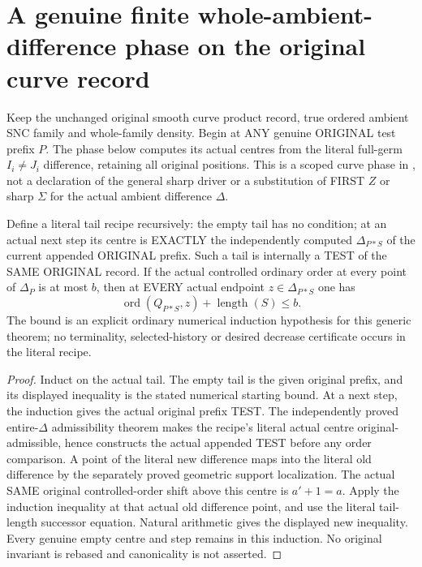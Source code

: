\section{A genuine finite whole-ambient-difference phase on the original curve record}

Keep the unchanged original smooth curve product record, true ordered ambient
SNC family and whole-family density. Begin at ANY genuine ORIGINAL test
prefix $P$. The phase below computes its actual centres from the literal
full-germ $I_i\ne J_i$ difference, retaining all original positions. This
is a scoped curve phase in \cite[\S12]{bierstone-milman97-invent-math},
not a declaration of the general sharp driver or a substitution of FIRST
$Z$ or sharp $\Sigma$ for the actual ambient difference $\Delta$.

\begin{theorem}
\label{hir:sharp-original-curve-literal-ambient-difference-history-order-bound}
\leanok
Define a literal tail recipe recursively: the empty tail has no condition;
at an actual next step its centre is EXACTLY the independently computed
$\Delta_{P*S}$ of the current appended ORIGINAL prefix. Such a tail is
internally a TEST of the SAME ORIGINAL record. If the actual controlled
ordinary order at every point of $\Delta_P$ is at most $b$, then at EVERY
actual endpoint $z\in\Delta_{P*S}$ one has
\[
 \operatorname{ord}(Q_{P*S},z)+\operatorname{length}(S)\leq b.
\]
The bound is an explicit ordinary numerical induction hypothesis for this
generic theorem; no terminality, selected-history or desired decrease
certificate occurs in the literal recipe.
\end{theorem}
\begin{proof}
Induct on the actual tail. The empty tail is the given original prefix,
and its displayed inequality is the stated numerical starting bound.
At a next step, the induction gives the actual original prefix TEST.
The independently proved entire-$\Delta$ admissibility theorem makes
the recipe's literal actual centre original-admissible, hence constructs
the actual appended TEST before any order comparison.
A point of the literal new difference maps into the literal old difference
by the separately proved geometric support localization. The actual SAME
original controlled-order shift above this centre is $a'+1=a$.
Apply the induction inequality at that actual old difference point, and
use the literal tail-length successor equation. Natural arithmetic gives
the displayed new inequality. Every genuine empty centre and step remains
in this induction. No original invariant is rebased and canonicality is
not asserted.
\end{proof}

